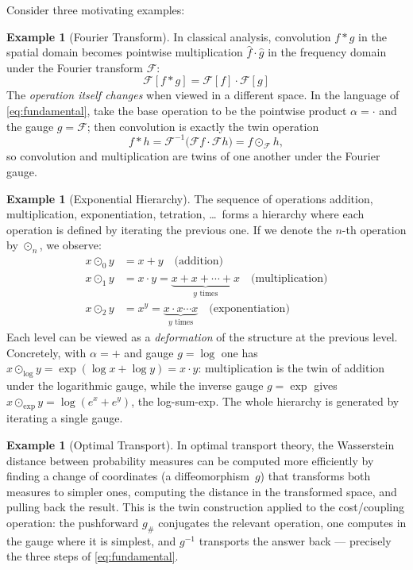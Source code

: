 \documentclass[11pt,a4paper,openany]{book}
\theoremstyle{plain}
\theoremstyle{definition}
\newtheorem{example}[theorem]{Example}
\newcommand{\twing}[1]{\odot_{#1}}
\begin{document}
Consider three motivating examples:

\begin{example}[Fourier Transform]\label{ex:fourier}
In classical analysis, convolution $f \ast g$ in the spatial domain becomes pointwise multiplication $\hat{f} \cdot \hat{g}$ in the frequency domain under the Fourier transform $\mathcal{F}$:
\[
\mathcal{F}[f \ast g] = \mathcal{F}[f] \cdot \mathcal{F}[g]
\]
The \emph{operation itself changes} when viewed in a different space. In the language of
\eqref{eq:fundamental}, take the base operation to be the pointwise product $\alpha=\cdot$ and the gauge
$g=\mathcal{F}$; then convolution is exactly the twin operation
\[
f\ast h=\mathcal{F}^{-1}\big(\mathcal{F}f\cdot\mathcal{F}h\big)=f\twing{\mathcal{F}}h,
\]
so convolution and multiplication are twins of one another under the Fourier gauge.
\end{example}

\begin{example}[Exponential Hierarchy]\label{ex:exp-hierarchy}
The sequence of operations addition, multiplication, exponentiation, tetration, \ldots\ forms a hierarchy where each operation is defined by iterating the previous one. If we denote the $n$-th operation by $\odot_n$, we observe:
\begin{align*}
x \odot_0 y &= x + y \quad \text{(addition)} \\
x \odot_1 y &= x \cdot y = \underbrace{x + x + \cdots + x}_{y \text{ times}} \quad \text{(multiplication)} \\
x \odot_2 y &= x^y = \underbrace{x \cdot x \cdots x}_{y \text{ times}} \quad \text{(exponentiation)}
\end{align*}
Each level can be viewed as a \emph{deformation} of the structure at the previous level. Concretely, with
$\alpha=+$ and gauge $g=\log$ one has $x\twing{\log}y=\exp(\log x+\log y)=x\cdot y$: multiplication is the twin
of addition under the logarithmic gauge, while the inverse gauge $g=\exp$ gives
$x\twing{\exp}y=\log(e^{x}+e^{y})$, the log-sum-exp. The whole hierarchy is generated by iterating a single gauge.
\end{example}

\begin{example}[Optimal Transport]\label{ex:optimal-transport}
In optimal transport theory, the Wasserstein distance between probability measures can be computed more efficiently by finding a change of coordinates (a diffeomorphism~$g$) that transforms both measures to simpler ones, computing the distance in the transformed space, and pulling back the result. This is the twin construction
applied to the cost/coupling operation: the pushforward $g_{\#}$ conjugates the relevant operation, one
computes in the gauge where it is simplest, and $g^{-1}$ transports the answer back --- precisely the three
steps of \eqref{eq:fundamental}.
\end{example}
\end{document}
